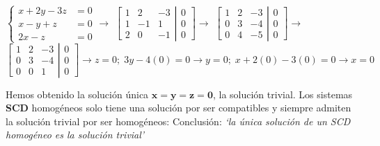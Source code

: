 \begin{ejem}
	$\begin{cases} x+2y-3z &=0 \\ x-y+z &=0 \\ 2x-z&=0 \end{cases} \to$
$\left[ \begin{matrix}
  1 & 2 & -3 \\ 1 & -1 & 1 \\ 2 & 0 & -1 
 \end{matrix}\right. 
 \left| \begin{matrix}
  0 \\ 0 \\ 0 
 \end{matrix}\right] \to $
 $\left[ \begin{matrix}
 1  & 2 & -3 \\ 0 & 3 & -4 \\ 0 & 4 & -5 
 \end{matrix}\right. 
 \left| \begin{matrix}
  0 \\ 0 \\ 0 
 \end{matrix}\right] \to $
$\left[ \begin{matrix}
 1  & 2 & -3 \\ 0 & 3 & -4 \\ 0 & 0 & 1 
 \end{matrix}\right. 
 \left| \begin{matrix}
  0 \\ 0 \\ 0 
 \end{matrix}\right] \to z=0; \; 3y-4(0)=0 \to y=0; \; x+2(0)-3(0)=0 \to x=0$
 
 Hemos obtenido la solución única $\boldsymbol{x=y=z=0}$, la solución trivial. Los sistemas \textbf{SCD} homogéneos solo tiene una solución por ser compatibles y siempre admiten la solución trivial por ser homogéneos: Conclusión: \textit{`la única solución de un SCD homogéneo es la solución trivial'}
\end{ejem}

